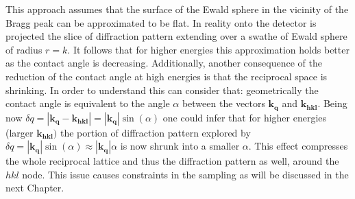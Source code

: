 This approach assumes that the surface of the Ewald sphere in the vicinity of the Bragg peak can be approximated to be flat. 
In reality onto the detector is projected the slice of diffraction pattern extending over a swathe of Ewald sphere of 
radius $r = k$. It follows that for higher energies this approximation holds better as the contact angle is decreasing. 
Additionally, another consequence of the reduction of the contact angle at high energies is that the reciprocal space 
is shrinking. In order to understand this can consider that:
geometrically the contact angle is equivalent to the angle $\alpha$ between the vectors $\mathbf{k}_\mathbf{q}$ and $\mathbf{k}_\mathbf{hkl}$. 
Being now $\delta q = |\mathbf{k}_\mathbf{q} - \mathbf{k}_\mathbf{hkl}| = |\mathbf{k}_\mathbf{q}|\sin (\alpha)$ one 
could infer that for higher energies (larger $\mathbf{k}_\mathbf{hkl})$ the portion of diffraction pattern 
explored by $\delta q = |\mathbf{k}_\mathbf{q}|\sin (\alpha) \approx |\mathbf{k}_\mathbf{q}|\alpha$ 
is now shrunk into a smaller $\alpha$. This effect compresses the whole reciprocal lattice and thus the  
diffraction pattern as well, around the $hkl$ node. This issue causes constraints in the sampling as will be discussed 
in the next Chapter.



